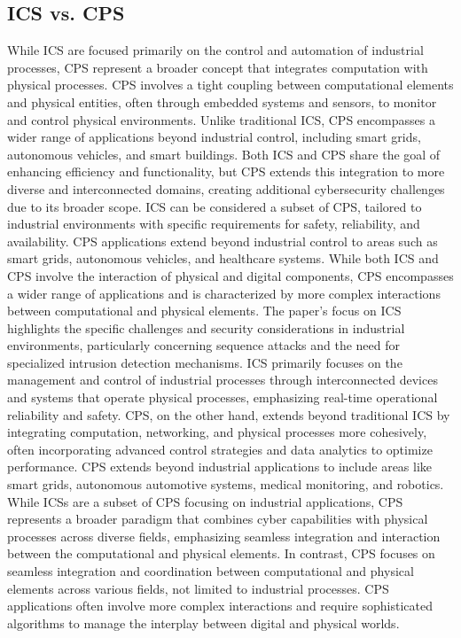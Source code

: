 \subsection{ICS vs. CPS}
While ICS are focused primarily on the control and automation of industrial processes, CPS represent a broader concept that integrates computation with physical processes. CPS involves a tight coupling between computational elements and physical entities, often through embedded systems and sensors, to monitor and control physical environments. Unlike traditional ICS, CPS encompasses a wider range of applications beyond industrial control, including smart grids, autonomous vehicles, and smart buildings. Both ICS and CPS share the goal of enhancing efficiency and functionality, but CPS extends this integration to more diverse and interconnected domains, creating additional cybersecurity challenges due to its broader scope\cite{7, 163,164,165}.
ICS can be considered a subset of CPS, tailored to industrial environments with specific requirements for safety, reliability, and availability. CPS applications extend beyond industrial control to areas such as smart grids, autonomous vehicles, and healthcare systems\cite{8,205}.
While both ICS and CPS involve the interaction of physical and digital components, CPS encompasses a wider range of applications and is characterized by more complex interactions between computational and physical elements. The paper's focus on ICS highlights the specific challenges and security considerations in industrial environments, particularly concerning sequence attacks and the need for specialized intrusion detection mechanisms\cite{9}.
ICS primarily focuses on the management and control of industrial processes through interconnected devices and systems that operate physical processes, emphasizing real-time operational reliability and safety. CPS, on the other hand, extends beyond traditional ICS by integrating computation, networking, and physical processes more cohesively, often incorporating advanced control strategies and data analytics to optimize performance\cite{10}.
CPS extends beyond industrial applications to include areas like smart grids, autonomous automotive systems, medical monitoring, and robotics. While ICSs are a subset of CPS focusing on industrial applications, CPS represents a broader paradigm that combines cyber capabilities with physical processes across diverse fields, emphasizing seamless integration and interaction between the computational and physical elements\cite{11}.
In contrast, CPS focuses on seamless integration and coordination between computational and physical elements across various fields, not limited to industrial processes. CPS applications often involve more complex interactions and require sophisticated algorithms to manage the interplay between digital and physical worlds\cite{12}.